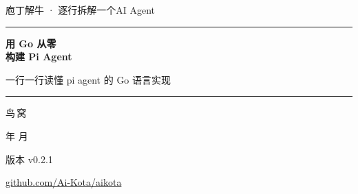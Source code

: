 \begin{titlepage}
\thispagestyle{empty}
\centering
\vspace*{2cm}

{\sffamily\large\color{structurecolor!75} 庖丁解牛 · 逐行拆解一个AI Agent\par}
\vspace{0.5cm}
{\color{accentrule}\rule{0.30\linewidth}{0.8pt}\par}
\vspace{1.5cm}

{\sffamily\bfseries\fontsize{42}{50}\selectfont\color{structurecolor} 用 Go 从零\\[0.25em]构建 Pi Agent\par}
\vspace{1.2cm}

{\Large\sffamily 一行一行读懂 pi agent 的 Go 语言实现\par}

\vspace{1.7cm}
{\color{structurecolor}\rule{0.55\linewidth}{1.4pt}\par}

\vfill

{\LARGE\sffamily 鸟\,窝\par}
\vspace{0.9cm}
{\sffamily\color{black!60} \number\year 年 \number\month 月\par}
\vspace{0.4cm}
{\sffamily\color{structurecolor!85} 版本 v0.2.1\par}
\vspace{0.4cm}
{\small\ttfamily\color{structurecolor} \href{https://github.com/Ai-Kota/aikota}{github.com/Ai-Kota/aikota}\par}
\vspace{1.4cm}
\end{titlepage}
